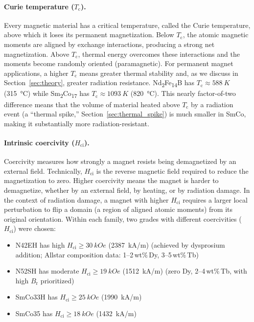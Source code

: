 \documentclass[11pt,letterpaper]{article}
\newcommand{\NdFeB}{Nd\textsubscript{2}Fe\textsubscript{14}B}
\newcommand{\SmCo}{Sm\textsubscript{2}Co\textsubscript{17}}
\newcommand{\smco}{SmCo}
\newcommand{\Tc}{T_\mathrm{c}}
\newcommand{\Hci}{H_\mathrm{ci}}
\newcommand{\Br}{B_\mathrm{r}}
\begin{document}
\paragraph{Curie temperature ($\Tc$).}
Every magnetic material has a critical temperature, called the Curie
temperature, above which it loses its permanent magnetization. Below $\Tc$,
the atomic magnetic moments are aligned by exchange interactions, producing a
strong net magnetization. Above $\Tc$, thermal energy overcomes these
interactions and the moments become randomly oriented (paramagnetic). For
permanent magnet applications, a higher $\Tc$ means greater thermal stability
and, as we discuss in Section~\ref{sec:theory}, greater radiation resistance.
\NdFeB{} has $\Tc \approx \SI{588}{K}$ (\SI{315}{\celsius}) while \SmCo{} has
$\Tc \approx \SI{1093}{K}$ (\SI{820}{\celsius}). This nearly factor-of-two
difference means that the volume of material heated above $\Tc$ by a radiation
event (a ``thermal spike,'' Section~\ref{sec:thermal_spike}) is much smaller
in \smco{}, making it substantially more radiation-resistant.

\paragraph{Intrinsic coercivity ($\Hci$).}
Coercivity measures how strongly a magnet resists being demagnetized by an
external field. Technically, $\Hci$ is the reverse magnetic field required to
reduce the magnetization to zero. Higher coercivity means the magnet is harder
to demagnetize, whether by an external field, by heating, or by radiation
damage. In the context of radiation damage, a magnet with higher $\Hci$
requires a larger local perturbation to flip a domain (a region of aligned
atomic moments) from its original orientation. Within
each family, two grades with different coercivities ($\Hci$) were chosen:
\begin{itemize}
    \item N42EH has high $\Hci \geq \SI{30}{kOe}$ (\SI{2387}{kA/m}) (achieved by
    dysprosium addition; Allstar composition data: 1--2\,wt\%\,Dy, 3--5\,wt\%\,Tb)
    \item N52SH has moderate $\Hci \geq \SI{19}{kOe}$ (\SI{1512}{kA/m}) (zero Dy,
    2--4\,wt\%\,Tb, with high $\Br$ prioritized)
    \item SmCo33H has $\Hci \geq \SI{25}{kOe}$ (\SI{1990}{kA/m})
    \item SmCo35 has $\Hci \geq \SI{18}{kOe}$ (\SI{1432}{kA/m})
\end{itemize}
\end{document}
